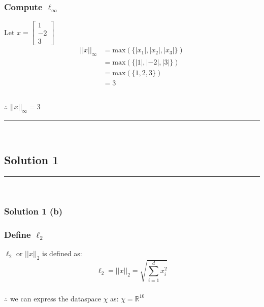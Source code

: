 \documentclass{article}
\begin{document}
\subsubsection*{Compute $\ell_{\infty}$}
\parbox{\textwidth}{
Let $x=\begin{bmatrix} 1 \\ -2 \\ 3 \end{bmatrix}$ \\

\begin{align*}
  ||x||_{\infty} &= \text{max}(\{|x_{1}|,|x_{2}|,|x_{3}|\}) \\
  &= \text{max}(\{|1|,|-2|,|3|\}) \\
  &= \text{max}(\{1,2,3\}) \\
  &= 3 \\
\end{align*}
}


\subsubsection*{\normalfont}{$\therefore$ $||x||_{\infty} = 3$}

\noindent\rule{\textwidth}{0.4pt}\\

\newpage


\subsection*{Solution 1}
\noindent\rule{\textwidth}{0.4pt}\\

\subsubsection*{Solution 1 (b)}
\subsubsection*{Define $\ell_2$}
\parbox{\textwidth}{
$\ell_2$ or $||x||_2$ is defined as:
$$\ell_{2} = ||x||_2 = \sqrt{\sum_{i=1}^{d} x_{i}^{2} }$$
}


\subsubsection*{\normalfont}{$\therefore$ we can express the dataspace $\chi$ as: $\chi = \mathbb{R}^{10}$}
\end{document}
